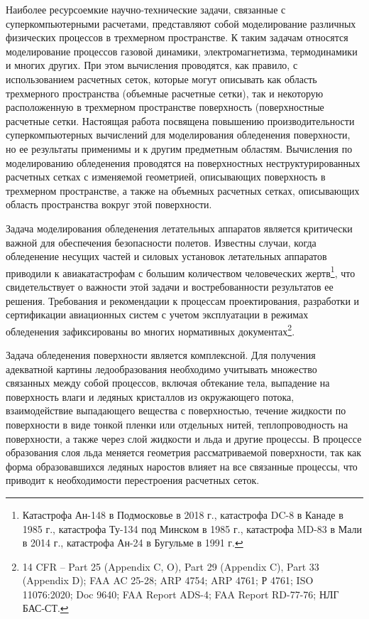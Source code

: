 \documentclass[a4paper,14pt]{extarticle}                     %
\theoremstyle{plain}                                         %
\begin{document}
Наиболее ресурсоемкие научно-технические задачи, связанные с суперкомпьютерными расчетами, представляют собой моделирование различных физических процессов в трехмерном пространстве.
К таким задачам относятся моделирование процессов газовой динамики, электромагнетизма, термодинамики и многих других.
При этом вычисления проводятся, как правило, с использованием расчетных сеток, которые могут описывать как область трехмерного пространства (объемные расчетные сетки), так и некоторую расположенную в трехмерном пространстве поверхность (поверхностные расчетные сетки.
Настоящая работа посвящена повышению производительности суперкомпьютерных вычислений для моделирования обледенения поверхности, но ее результаты применимы и к другим предметным областям.
Вычисления по моделированию обледенения проводятся на поверхностных неструктурированных расчетных сетках с изменяемой геометрией, описывающих поверхность в трехмерном пространстве, а также на объемных расчетных сетках, описывающих область пространства вокруг этой поверхности.

Задача моделирования обледенения летательных аппаратов является критически важной для обеспечения безопасности полетов.
Известны случаи, когда обледенение несущих частей и силовых установок летательных аппаратов приводили к авиакатастрофам с большим количеством человеческих жертв\footnote[1]{Катастрофа Ан-148 в Подмосковье в 2018 г., катастрофа DC-8 в Канаде в 1985 г., катастрофа Ту-134 под Минском в 1985 г., катастрофа MD-83 в Мали в 2014 г., катастрофа Ан-24 в Бугульме в 1991 г.}, что свидетельствует о важности этой задачи и востребованности результатов ее решения.
Требования и рекомендации к процессам проектирования, разработки и сертификации авиационных систем с учетом эксплуатации в режимах обледенения зафиксированы во многих нормативных документах\footnote[2]{14 CFR -- Part 25 (Appendix C, O), Part 29 (Appendix C), Part 33 (Appendix D); FAA AC 25-28; ARP 4754; ARP 4761; Р 4761; ISO 11076:2020; Doc 9640; FAA Report ADS-4; FAA Report RD-77-76; НЛГ БАС-СТ.}.

Задача обледенения поверхности является комплексной.
Для получения адекватной картины ледообразования необходимо учитывать множество связанных между собой процессов, включая обтекание тела, выпадение на поверхность влаги и ледяных кристаллов из окружающего потока, взаимодействие выпадающего вещества с поверхностью, течение жидкости по поверхности в виде тонкой пленки или отдельных нитей, теплопроводность на поверхности, а также через слой жидкости и льда и другие процессы.
В процессе образования слоя льда меняется геометрия рассматриваемой поверхности, так как форма образовавшихся ледяных наростов влияет на все связанные процессы, что приводит к необходимости перестроения расчетных сеток.
\end{document}
